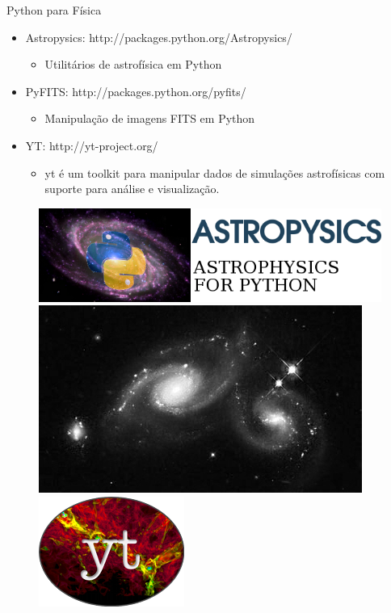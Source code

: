 \documentclass[12pt,t,graphics]{beamer}
\begin{document}
\begin{frame}[t]{Python para Física}
	\begin{itemize}
		\item Astropysics: http://packages.python.org/Astropysics/
		\begin{itemize}
			\item Utilitários de astrofísica em Python
		\end{itemize}
		\item PyFITS: http://packages.python.org/pyfits/
		\begin{itemize}
			\item Manipulação de imagens FITS em Python
		\end{itemize}
		\item YT: http://yt-project.org/
		\begin{itemize}
			\item yt é um toolkit para manipular dados de simulações astrofísicas
			com suporte para análise e visualização.
		\end{itemize}
	\end{itemize}
	
	\begin{figure}
		\centering
		\includegraphics[scale=1.0]{img/astropysics.png}
		\hspace{0.25cm}
		\includegraphics[scale=0.2]{img/pyfits-ex.jpg}
		\hspace{0.25cm}
		\includegraphics[scale=0.4]{img/yt_icon.png}
	\end{figure}
\end{frame}
\end{document}
